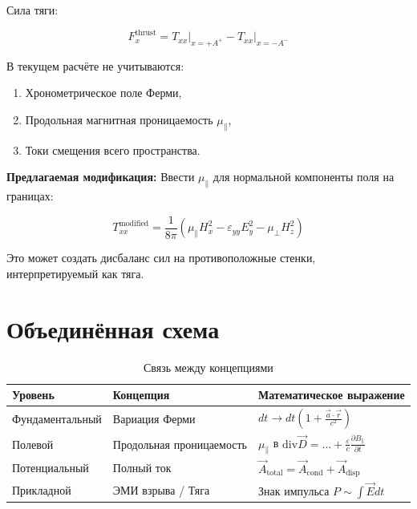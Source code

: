 \documentclass[12pt, a4paper]{article}
\begin{document}
Сила тяги:

\begin{equation}
F_x^{\text{thrust}} = T_{xx}\big|_{x=+A^+} - T_{xx}\big|_{x=-A^-}
\label{eq:thrust_force}
\end{equation}

В текущем расчёте \cite{MenDrive} не учитываются:
\begin{enumerate}
    \item Хронометрическое поле Ферми,
    \item Продольная магнитная проницаемость $\mu_{\parallel}$,
    \item Токи смещения всего пространства.
\end{enumerate}

\textbf{Предлагаемая модификация:} Ввести $\mu_{\parallel}$ для нормальной компоненты поля на границах:

\begin{equation}
T_{xx}^{\text{modified}} = \frac{1}{8\pi} \left( \mu_{\parallel} H_x^2 - \varepsilon_{yy} E_y^2 - \mu_{\perp} H_z^2 \right)
\label{eq:stress_tensor_modified}
\end{equation}

Это может создать дисбаланс сил на противоположные стенки, интерпретируемый как тяга.

\section{Объединённая схема}

\begin{table}[h]
\centering
\caption{Связь между концепциями}
\begin{tabular}{|l|l|l|}
\hline
\textbf{Уровень} & \textbf{Концепция} & \textbf{Математическое выражение} \\
\hline
Фундаментальный & Вариация Ферми & $dt \to dt(1 + \frac{\vec{a}\cdot\vec{r}}{c^2})$ \\
\hline
Полевой & Продольная проницаемость & $\mu_{\parallel}$ в $\text{div}\vec{D} = \dots + \frac{\varepsilon}{c}\frac{\partial B_{\parallel}}{\partial t}$ \\
\hline
Потенциальный & Полный ток & $\vec{A}_{\text{total}} = \vec{A}_{\text{cond}} + \vec{A}_{\text{disp}}$ \\
\hline
Прикладной & ЭМИ взрыва / Тяга & Знак импульса $P \sim \int \vec{E} dt$ \\
\hline
\end{tabular}
\label{tab:unified}
\end{table}
\end{document}
